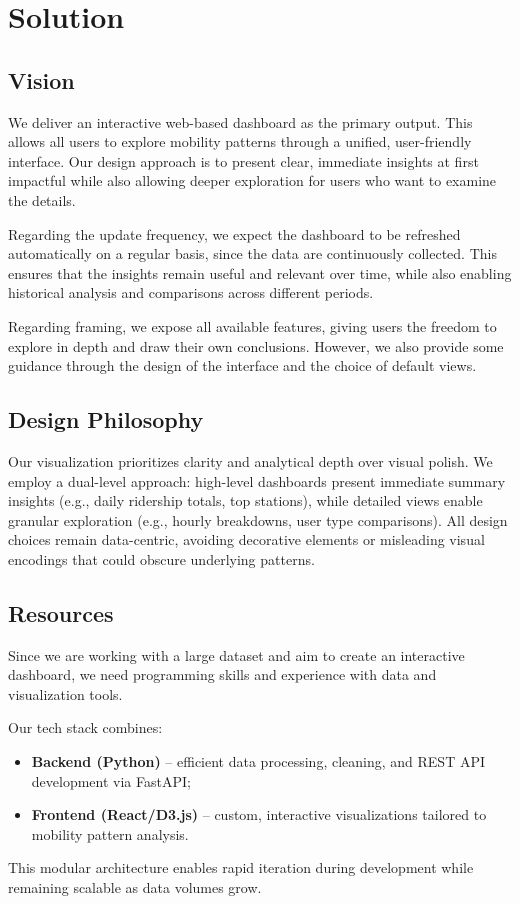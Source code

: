 \section{Solution}
\subsection{Vision}
We deliver an interactive web-based dashboard as the primary output.
This allows all users to explore mobility patterns through a unified, user-friendly interface.
Our design approach is to present clear, immediate insights at first impactful while also allowing deeper exploration for users who want to examine the details.

Regarding the update frequency, we expect the dashboard to be refreshed automatically on a regular basis, since the data are continuously collected.
This ensures that the insights remain useful and relevant over time, while also enabling historical analysis and comparisons across different periods.

Regarding framing, we expose all available features, giving users the freedom to explore in depth and draw their own conclusions.
However, we also provide some guidance through the design of the interface and the choice of default views.

\subsection{Design Philosophy}
Our visualization prioritizes clarity and analytical depth over visual polish.
We employ a dual-level approach: high-level dashboards present immediate summary insights (e.g., daily ridership totals, top stations), while detailed views enable granular exploration (e.g., hourly breakdowns, user type comparisons).
All design choices remain data-centric, avoiding decorative elements or misleading visual encodings that could obscure underlying patterns.

\subsection{Resources}
Since we are working with a large dataset and aim to create an interactive dashboard, we need programming skills and experience with data and visualization tools.

Our tech stack combines:
\begin{itemize}[beginpenalty=10000]
  \item \textbf{Backend (Python)} -- efficient data processing, cleaning, and REST API development via FastAPI;
  \item \textbf{Frontend (React/D3.js)} -- custom, interactive visualizations tailored to mobility pattern analysis.
\end{itemize}
This modular architecture enables rapid iteration during development while remaining scalable as data volumes grow.

